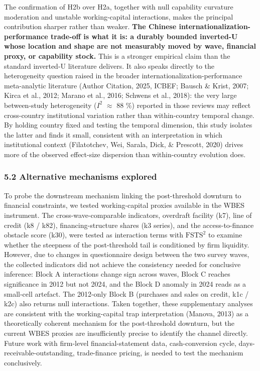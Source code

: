 \documentclass[12pt,a4paper]{article}
\begin{document}
The confirmation of H2b over H2a, together with null capability
curvature moderation and unstable working-capital interactions, makes
the principal contribution sharper rather than weaker. \textbf{The
Chinese internationalization-performance trade-off is what it is: a
durably bounded inverted-U whose location and shape are not measurably
moved by wave, financial proxy, or capability stock.} This is a stronger
empirical claim than the standard inverted-U literature delivers. It
also speaks directly to the heterogeneity question raised in the broader
internationalization-performance meta-analytic literature (Author
Citation, 2025, ICBEF; Bausch \& Krist, 2007; Kirca et al., 2012; Marano
et al., 2016; Schwens et al., 2018): the very large between-study
heterogeneity (\(I^2\) \(\approx\) 88 \%) reported in those reviews may
reflect cross-country institutional variation rather than within-country
temporal change. By holding country fixed and testing the temporal
dimension, this study isolates the latter and finds it small, consistent
with an interpretation in which institutional context (Filatotchev, Wei,
Sarala, Dick, \& Prescott, 2020) drives more of the observed effect-size
dispersion than within-country evolution does.

\hypertarget{52-alternative-mechanisms-explored}{%
\subsubsection{5.2 Alternative mechanisms
explored}\label{52-alternative-mechanisms-explored}}

To probe the downstream mechanism linking the post-threshold downturn to
financial constraints, we tested working-capital proxies available in
the WBES instrument. The cross-wave-comparable indicators, overdraft
facility (k7), line of credit (k8 / k82), financing-structure shares (k3
series), and the access-to-finance obstacle score (k30), were tested as
interaction terms with \(\mathrm{FSTS}^2\) to examine whether the
steepness of the post-threshold tail is conditioned by firm liquidity.
However, due to changes in questionnaire design between the two survey
waves, the collected indicators did not achieve the consistency needed
for conclusive inference: Block A interactions change sign across waves,
Block C reaches significance in 2012 but not 2024, and the Block D
anomaly in 2024 reads as a small-cell artefact. The 2012-only Block B
(purchases and sales on credit, k1c / k2c) also returns null
interactions. Taken together, these supplementary analyses are
consistent with the working-capital trap interpretation (Manova, 2013)
as a theoretically coherent mechanism for the post-threshold downturn,
but the current WBES proxies are insufficiently precise to identify the
channel directly. Future work with firm-level financial-statement data,
cash-conversion cycle, days-receivable-outstanding, trade-finance
pricing, is needed to test the mechanism conclusively.
\end{document}
